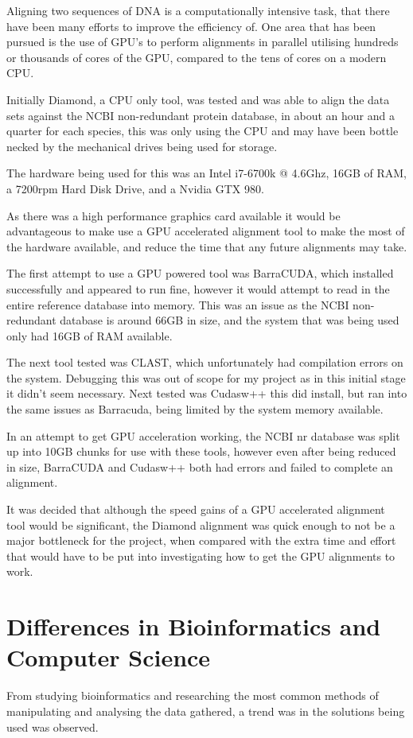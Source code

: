 Aligning two sequences of DNA is a computationally intensive task, that there have been many efforts to improve the efficiency of. One area that has been pursued is the use of GPU's to perform alignments in parallel utilising hundreds or thousands of cores of the GPU, compared to the tens of cores on a modern CPU. 

Initially Diamond\cite{diamond}, a CPU only tool, was tested and was able to align the data sets against the NCBI\cite{ncbi} non-redundant protein database\cite{nr}, in about an hour and a quarter for each species, this was only using the CPU and may have been bottle necked by the mechanical drives being used for storage. 

The hardware being used for this was an Intel i7-6700k @ 4.6Ghz, 16GB of RAM, a 7200rpm Hard Disk Drive, and a Nvidia GTX 980. 

As there was a high performance graphics card available it would be advantageous to make use a GPU accelerated alignment tool to make the most of the hardware available, and reduce the time that any future alignments may take. 

The first attempt to use a GPU powered tool was BarraCUDA\cite{barracuda}, which installed successfully and appeared to run fine, however it would attempt to read in the entire reference database into memory. This was an issue as the NCBI non-redundant database is around 66GB in size, and the system that was being used only had 16GB of RAM available. 

The next tool tested was CLAST\cite{clast}, which unfortunately had compilation errors on the system. Debugging this was out of scope for my project as in this initial stage it didn't seem necessary. Next tested was Cudasw++\cite{cudasw} this did install, but ran into the same issues as Barracuda, being limited by the system memory available. 

In an attempt to get GPU acceleration working, the NCBI nr database was split up into 10GB chunks for use with these tools, however even after being reduced in size, BarraCUDA and Cudasw++ both had errors and failed to complete an alignment. 

It was decided that although the speed gains of a GPU accelerated alignment tool would be significant, the Diamond alignment was quick enough to not be a major bottleneck for the project, when compared with the extra time and effort that would have to be put into investigating how to get the GPU alignments to work. 

\section{Differences in Bioinformatics and Computer Science}
From studying bioinformatics and researching the most common methods of manipulating and analysing the data gathered, a trend was in the solutions being used was observed. 

